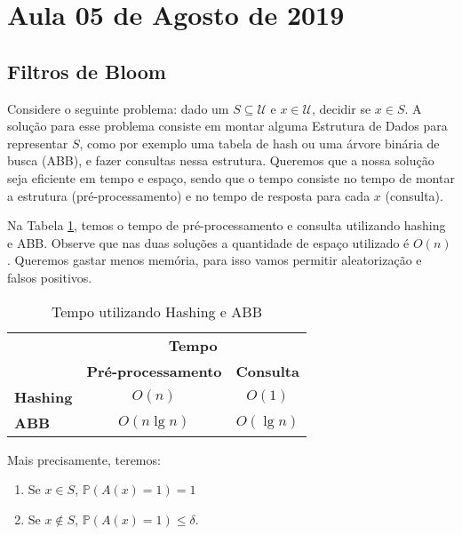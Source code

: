 \section{Aula 05 de Agosto de 2019}
\label{2019_08_05}

\subsection{Filtros de Bloom}

Considere o seguinte problema: dado um $S \subseteq \mathcal{U}$ e $x
\in \mathcal{U}$, decidir se $x \in S$. A solução para esse problema
consiste em montar alguma Estrutura de Dados para representar $S$,
como por exemplo uma tabela de hash ou uma árvore binária de busca
(ABB), e fazer consultas nessa estrutura. Queremos que a nossa solução
seja eficiente em tempo e espaço, sendo que o tempo consiste no tempo
de montar a estrutura (pré-processamento) e no tempo de resposta para
cada $x$ (consulta).

Na Tabela \ref{tab:tempo_problema_pertinencia}, temos o tempo de
pré-processamento e consulta utilizando hashing e ABB. Observe que nas
duas soluções a quantidade de espaço utilizado é $O(n)$. Queremos
gastar menos memória, para isso vamos permitir aleatorização e falsos
positivos.

\begin{table}[h]
\begin{tabular}{l|c|c|}
\cline{2-3}
                                       & \multicolumn{2}{c|}{\textbf{Tempo}}                                                      \\ \cline{2-3} 
                                       & \multicolumn{1}{l|}{\textbf{Pré-processamento}} & \multicolumn{1}{l|}{\textbf{Consulta}} \\ \hline
\multicolumn{1}{|l|}{\textbf{Hashing}} & $O(n)$                                          & $O(1)$                                 \\ \hline
\multicolumn{1}{|l|}{\textbf{ABB}}     & $O(n\lg n)$                                    & $O(\lg n)$                            \\ \hline
\end{tabular}
  \caption{Tempo utilizando Hashing e ABB}
  \label{tab:tempo_problema_pertinencia}
\end{table}

Mais precisamente, teremos:

\begin{enumerate}
\item Se $x \in S$, $\mathbb{P}(A(x)=1)=1$
\item Se $x \notin S$, $\mathbb{P}(A(x)=1) \leq \delta$.
\end{enumerate}

